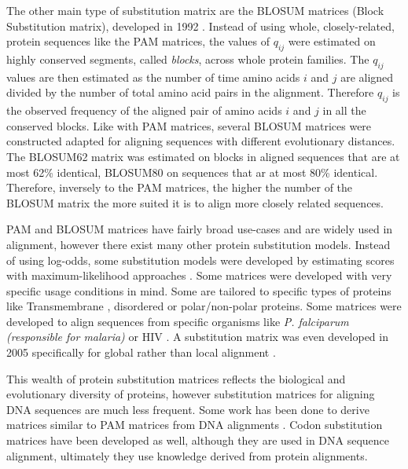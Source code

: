 \documentclass[
  11pt,
  twoside,
  BCOR=10mm,
  listof=totoc]{scrbook}
\begin{document}
The other main type of substitution matrix are the BLOSUM matrices (Block Substitution matrix), developed in 1992 \autocite{henikoffAminoAcidSubstitution1992}. Instead of using whole, closely-related, protein sequences like the PAM matrices, the values of \(q_{ij}\) were estimated on highly conserved segments, called \emph{blocks}, across whole protein families. The \(q_{ij}\) values are then estimated as the number of time amino acids \(i\) and \(j\) are aligned divided by the number of total amino acid pairs in the alignment. Therefore \(q_{ij}\) is the observed frequency of the aligned pair of amino acids \(i\) and \(j\) in all the conserved blocks. Like with PAM matrices, several BLOSUM matrices were constructed adapted for aligning sequences with different evolutionary distances. The BLOSUM62 matrix was estimated on blocks in aligned sequences that are at most 62\% identical, BLOSUM80 on sequences that ar at most 80\% identical. Therefore, inversely to the PAM matrices, the higher the number of the BLOSUM matrix the more suited it is to align more closely related sequences.

PAM and BLOSUM matrices have fairly broad use-cases and are widely used in alignment, however there exist many other protein substitution models. Instead of using log-odds, some substitution models were developed by estimating scores with maximum-likelihood approaches \autocite{whelanGeneralEmpiricalModel2001,leImprovedGeneralAmino2008}. Some matrices were developed with very specific usage conditions in mind. Some are tailored to specific types of proteins like Transmembrane \autocite{mullerNonsymmetricScoreMatrices2001,ngPHATTransmembranespecificSubstitution2000}, disordered \autocite{trivediAminoAcidSubstitution2019} or polar/non-polar \autocite{goonesekereContextspecificAminoAcid2008} proteins. Some matrices were developed to align sequences from specific organisms like \emph{P. falciparum} \autocite{pailaGenomeBiasInfluences2008} \emph{(responsible for malaria)} or HIV \autocite{nickleHIVSpecificProbabilisticModels2007}. A substitution matrix was even developed in 2005 specifically for global rather than local alignment \autocite{sardiuScoreStatisticsGlobal2005}.

This wealth of protein substitution matrices reflects the biological and evolutionary diversity of proteins, however substitution matrices for aligning DNA sequences are much less frequent. Some work has been done to derive matrices similar to PAM matrices from DNA alignments \autocite{chiaromonteScoringPairwiseGenomic2001}. Codon substitution matrices \autocite{schneiderEmpiricalCodonSubstitution2005,doron-faigenboimCombinedEmpiricalMechanistic2007} have been developed as well, although they are used in DNA sequence alignment, ultimately they use knowledge derived from protein alignments.
\end{document}
